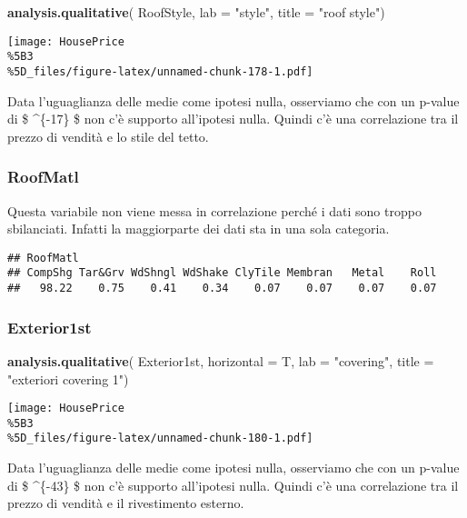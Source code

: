 \documentclass[
]{article}
\newenvironment{Shaded}{\begin{snugshade}}{\end{snugshade}}
\newcommand{\AttributeTok}[1]{\textcolor[rgb]{0.13,0.29,0.53}{#1}}
\newcommand{\FunctionTok}[1]{\textcolor[rgb]{0.13,0.29,0.53}{\textbf{#1}}}
\newcommand{\NormalTok}[1]{#1}
\newcommand{\StringTok}[1]{\textcolor[rgb]{0.31,0.60,0.02}{#1}}
\begin{document}
\begin{Shaded}
\begin{Highlighting}[]
\FunctionTok{analysis.qualitative}\NormalTok{(}
\NormalTok{    RoofStyle,}
    \AttributeTok{lab =} \StringTok{"style"}\NormalTok{,}
    \AttributeTok{title =} \StringTok{"roof style"}\NormalTok{)}
\end{Highlighting}
\end{Shaded}

\texttt{[image: HousePrice\\\%5B3\\\%5D\_files/figure-latex/unnamed-chunk-178-1.pdf]}

Data l'uguaglianza delle medie come ipotesi nulla, osserviamo che con un
p-value di \$ \^{}\{-17\} \$ non c'è supporto all'ipotesi
nulla. Quindi c'è una correlazione tra il prezzo di vendità e lo stile
del tetto.

\subsubsection{RoofMatl}\label{roofmatl-1}

Questa variabile non viene messa in correlazione perché i dati sono
troppo sbilanciati. Infatti la maggiorparte dei dati sta in una sola
categoria.

\begin{verbatim}
## RoofMatl
## CompShg Tar&Grv WdShngl WdShake ClyTile Membran   Metal    Roll 
##   98.22    0.75    0.41    0.34    0.07    0.07    0.07    0.07
\end{verbatim}

\subsubsection{Exterior1st}\label{exterior1st-1}

\begin{Shaded}
\begin{Highlighting}[]
\FunctionTok{analysis.qualitative}\NormalTok{(}
\NormalTok{    Exterior1st,}
    \AttributeTok{horizontal =}\NormalTok{ T,}
    \AttributeTok{lab =} \StringTok{"covering"}\NormalTok{,}
    \AttributeTok{title =} \StringTok{"exteriori covering 1"}\NormalTok{)}
\end{Highlighting}
\end{Shaded}

\texttt{[image: HousePrice\\\%5B3\\\%5D\_files/figure-latex/unnamed-chunk-180-1.pdf]}

Data l'uguaglianza delle medie come ipotesi nulla, osserviamo che con un
p-value di \$ \^{}\{-43\} \$ non c'è supporto all'ipotesi
nulla. Quindi c'è una correlazione tra il prezzo di vendità e il
rivestimento esterno.
\end{document}

